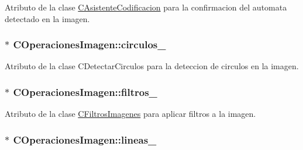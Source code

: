 Atributo de la clase \hyperlink{classCAsistenteCodificacion}{C\+Asistente\+Codificacion} para la confirmacion del automata detectado en la imagen. 

\subsubsection[{\texorpdfstring{circulos\+\_\+}{circulos_}}]{$\ast$ C\+Operaciones\+Imagen\+::circulos\+\_\+\hspace{0.3cm}{\ttfamily [private]}}\hypertarget{classCOperacionesImagen_a385572b456e0aeaa055392daecf325d6}{}\label{classCOperacionesImagen_a385572b456e0aeaa055392daecf325d6}


Atributo de la clase C\+Detectar\+Circulos para la deteccion de circulos en la imagen. 

\subsubsection[{\texorpdfstring{filtros\+\_\+}{filtros_}}]{$\ast$ C\+Operaciones\+Imagen\+::filtros\+\_\+\hspace{0.3cm}{\ttfamily [private]}}\hypertarget{classCOperacionesImagen_aa27657bee56e9afe2a64937e15c15d46}{}\label{classCOperacionesImagen_aa27657bee56e9afe2a64937e15c15d46}


Atributo de la clase \hyperlink{classCFiltrosImagenes}{C\+Filtros\+Imagenes} para aplicar filtros a la imagen. 

\subsubsection[{\texorpdfstring{lineas\+\_\+}{lineas_}}]{$\ast$ C\+Operaciones\+Imagen\+::lineas\+\_\+\hspace{0.3cm}{\ttfamily [private]}}\hypertarget{classCOperacionesImagen_a50efc40444cef260102dc2ceb6d4c608}{}\label{classCOperacionesImagen_a50efc40444cef260102dc2ceb6d4c608}


